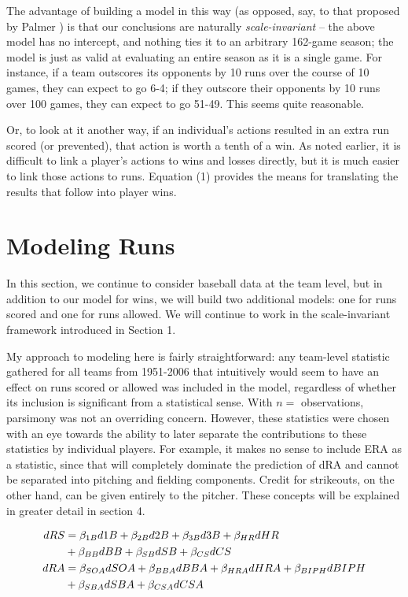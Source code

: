 \documentclass[a4paper,twoside,12pt]{article}
\begin{document}
The advantage of building a model in this way (as opposed, say, to that proposed by Palmer \cite{palmer}) is that our conclusions are naturally \emph{scale-invariant} -- the above model has no intercept, and nothing ties it to an arbitrary 162-game season; the model is just as valid at evaluating an entire season as it is a single game.  For instance, if a team outscores its opponents by 10 runs over the course of 10 games, they can expect to go 6-4; if they outscore their opponents by 10 runs over 100 games, they can expect to go 51-49.  This seems quite reasonable.

Or, to look at it another way, if an individual's actions resulted in an extra run scored (or prevented), that action is worth a tenth of a win.  As noted earlier, it is difficult to link a player's actions to wins and losses directly, but it is much easier to link those actions to runs.  Equation (1) provides the means for translating the results that follow into player wins.

\section{Modeling Runs}

In this section, we continue to consider baseball data at the team level, but in addition to our model for wins, we will build two additional models: one for runs scored and one for runs allowed.  We will continue to work in the scale-invariant framework introduced in Section 1.

My approach to modeling here is fairly straightforward: any team-level statistic gathered for all teams from 1951-2006 that intuitively would seem to have an effect on runs scored or allowed was included in the model, regardless of whether its inclusion is significant from a statistical sense.  With $n=$ observations, parsimony was not an overriding concern.  However, these statistics were chosen with an eye towards the ability to later separate the contributions to these statistics by individual players.  For example, it makes no sense to include ERA as a statistic, since that will completely dominate the prediction of dRA and cannot be separated into pitching and fielding components.  Credit for strikeouts, on the other hand, can be given entirely to the pitcher.  These concepts will be explained in greater detail in section 4.

\begin{align}
  dRS &= \beta_{1B} d1B + \beta_{2B} d2B + \beta_{3B} d3B + \beta_{HR} dHR\\
      &+ \beta_{BB} dBB + \beta_{SB} dSB + \beta_{CS} dCS \notag \\
  dRA &= \beta_{SOA} dSOA + \beta_{BBA} dBBA + \beta_{HRA} dHRA + \beta_{BIPH} dBIPH\\
      &+ \beta_{SBA} dSBA + \beta_{CSA} dCSA \notag %
\end{align}
\end{document}

